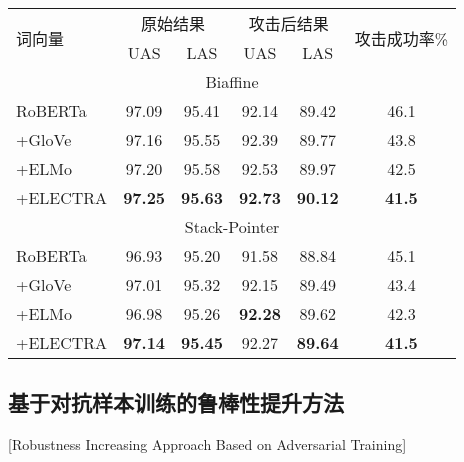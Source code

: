 \begin{table}[htbp]
    \vspace{0.5em}\centering\wuhao
	\begin{tabular}{lccccc}
		\toprule[1.5pt]
		\multirow{2}{*}{词向量}& \multicolumn{2}{c}{原始结果} & \multicolumn{2}{c}{攻击后结果} & \multirow{2}{*}{攻击成功率\%} \\
		\cmidrule(r){2-3} \cmidrule(r){4-5}
		& UAS & LAS & UAS & LAS & \\
		\midrule[1pt]
		\multicolumn{6}{c}{Biaffine} \\
		\hline
		RoBERTa        &97.09 & 95.41 &92.14 &89.42 &46.1 \\
		+GloVe     &97.16 & 95.55 &92.39 &89.77 &43.8 \\
		+ELMo   &97.20 & 95.58 &92.53 &89.97 &42.5 \\
		+ELECTRA &\bf97.25 &\bf95.63 &\bf92.73 &\bf90.12 &\bf41.5 \\
		\hline
		\multicolumn{6}{c}{Stack-Pointer} \\
		\hline
		RoBERTa        &96.93 & 95.20 &91.58 &88.84 &45.1 \\
		+GloVe     &97.01 & 95.32 &92.15 &89.49 &43.4 \\
		+ELMo   &96.98 & 95.26 &\bf 92.28 &89.62 &42.3 \\
		+ELECTRA &\bf 97.14 &\bf 95.45 &92.27 &\bf 89.64 &\bf 41.5 \\
		\bottomrule[1.5pt]
	\end{tabular}
\end{table}


\subsection{基于对抗样本训练的鲁棒性提升方法}[Robustness Increasing Approach Based on Adversarial Training]

